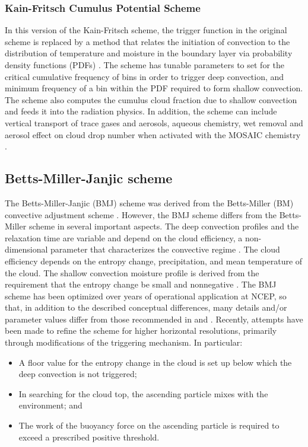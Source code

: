\subsubsection{Kain-Fritsch Cumulus Potential Scheme}

In this version of the Kain-Fritsch scheme, the trigger function in the original scheme 
is replaced by a method that relates the initiation of convection to the distribution of 
temperature and moisture in the boundary layer via probability density functions (PDFs)
\citep{berg13}. The scheme has tunable 
parameters to set for the critical cumulative frequency of bins in order to trigger deep 
convection, and minimum frequency of a bin within the PDF required to form shallow convection. 
The scheme also computes the cumulus cloud fraction due to shallow convection and feeds it into 
the radiation physics. In addition, the scheme can include vertical transport of trace gases and 
aerosols, aqueous chemistry, wet removal and aerosol effect on cloud drop number when 
activated with the MOSAIC chemistry \citep{berg15}.


\subsection{Betts-Miller-Janjic scheme}

The Betts-Miller-Janjic (BMJ) scheme  \citep{janjic94,janjic00} 
was derived from the Betts-Miller (BM) convective adjustment scheme 
\citep{betts86,bettsmiller86}.  However, the BMJ scheme differs 
from the Betts-Miller scheme in several important aspects. The deep convection 
profiles and the relaxation time are variable and depend on the cloud 
efficiency, a non-dimensional parameter that characterizes the convective 
regime \citep{janjic94}. The cloud efficiency depends on the entropy change, 
precipitation, and mean temperature of the cloud. The shallow convection 
moisture profile is derived from the requirement that the entropy change be 
small and nonnegative \citep{janjic94}.  The BMJ scheme has been optimized 
over years of operational application at NCEP,
so that, in addition to the described conceptual 
differences, many details and/or parameter values differ from those 
recommended in \citet{betts86} and \citet{bettsmiller86}.  Recently, attempts 
have been made to refine the scheme for higher horizontal resolutions, 
primarily through modifications of the triggering mechanism.  In particular:
 
\begin{itemize}\setlength{\parskip}{-4pt}
\item
A floor value for the entropy change in the cloud is set up below which the 
deep convection is not triggered;
\item
In searching for the cloud top, the ascending particle mixes with the environment; and
\item
The work of the buoyancy force on the ascending particle is required to exceed 
a prescribed positive threshold.
\end{itemize}

